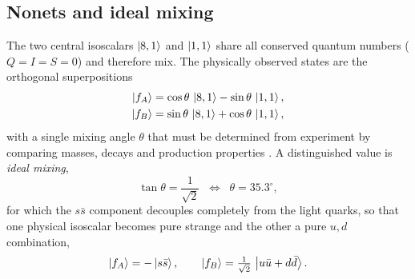 \subsection{Nonets and ideal mixing}
\label{subsec:nonets}

The two central isoscalars $\ket{8,1}$ and $\ket{1,1}$ share all conserved quantum
numbers ($Q = I = S = 0$) and therefore mix. The physically observed states are the
orthogonal superpositions
\begin{align}
    \ket{f_A} &= \cos\theta\,\ket{8,1} - \sin\theta\,\ket{1,1}, \notag\\
    \ket{f_B} &= \sin\theta\,\ket{8,1} + \cos\theta\,\ket{1,1},
    \label{eq:nonet_mixing}
\end{align}
with a single mixing angle $\theta$ that must be determined from experiment by
comparing masses, decays and production properties \cite[Ch.~5]{Amsler2018}. A
distinguished value is \emph{ideal mixing},
\begin{equation}
    \tan\theta = \frac{1}{\sqrt 2}
    \;\;\Longleftrightarrow\;\;
    \theta = 35.3^\circ,
    \label{eq:ideal_mixing}
\end{equation}
for which the $s\bar s$ component decouples completely from the light quarks, so that
one physical isoscalar becomes pure strange and the other a pure $u,d$ combination,
\begin{equation}
    \ket{f_A} = -\ket{s\bar s},
    \qquad
    \ket{f_B} = \tfrac{1}{\sqrt 2}\,\ket{u\bar u + d\bar d}.
    \label{eq:ideal_states}
\end{equation}

